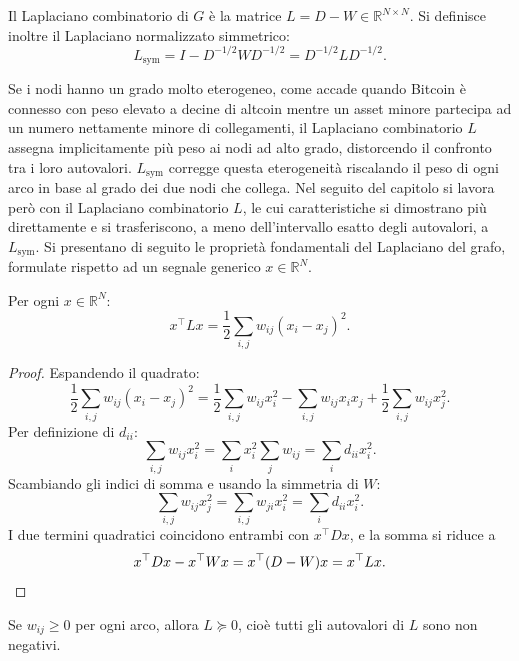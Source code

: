 \begin{definition}
\label{def:laplacian}
Il Laplaciano combinatorio di $G$ è la matrice $L = D - W \in \mathbb{R}^{N \times N}$. Si definisce inoltre il Laplaciano normalizzato simmetrico:
$$L_{\mathrm{sym}} = I - D^{-1/2}WD^{-1/2} = D^{-1/2}LD^{-1/2}.$$
\end{definition}

Se i nodi hanno un grado molto eterogeneo, come accade quando Bitcoin è connesso con peso elevato a decine di altcoin mentre un asset minore partecipa ad un numero nettamente minore di collegamenti, il Laplaciano combinatorio $L$ assegna implicitamente più peso ai nodi ad alto grado, distorcendo il confronto tra i loro autovalori. $L_{\mathrm{sym}}$ corregge questa eterogeneità riscalando il peso di ogni arco in base al grado dei due nodi che collega. Nel seguito del capitolo si lavora però con il Laplaciano combinatorio $L$, le cui caratteristiche si dimostrano più direttamente e si trasferiscono, a meno dell'intervallo esatto degli autovalori, a $L_{\mathrm{sym}}$. Si presentano di seguito le proprietà fondamentali del Laplaciano del grafo, formulate rispetto ad un segnale generico $x \in \mathbb{R}^N$.

\begin{proposition}
\label{prop:quadratic-form}
Per ogni $x \in \mathbb{R}^N$:
$$x^\top L x = \frac{1}{2}\sum_{i,j} w_{ij}(x_i - x_j)^2.$$
\end{proposition}

\begin{proof}
Espandendo il quadrato:
$$\frac12\sum_{i,j}w_{ij}(x_i-x_j)^2 = \frac12\sum_{i,j}w_{ij}x_i^2 - \sum_{i,j}w_{ij}x_ix_j + \frac12\sum_{i,j}w_{ij}x_j^2.$$
Per definizione di $d_{ii}$:
$$\sum_{i,j}w_{ij}x_i^2 = \sum_i x_i^2 \sum_j w_{ij} = \sum_i d_{ii}x_i^2.$$
Scambiando gli indici di somma e usando la simmetria di $W$:
$$\sum_{i,j}w_{ij}x_j^2 = \sum_{i,j}w_{ji}x_i^2 = \sum_i d_{ii}x_i^2.$$
I due termini quadratici coincidono entrambi con $x^\top Dx$, e la somma si riduce a
\begin{equation*}
x^\top Dx - x^\top Wx = x^\top(D-W)x = x^\top Lx. \qedhere
\end{equation*}
\end{proof}

\begin{proposition}
\label{prop:psd}
Se $w_{ij}\geq 0$ per ogni arco, allora $L \succeq 0$, cioè tutti gli autovalori di $L$ sono non negativi.
\end{proposition}

